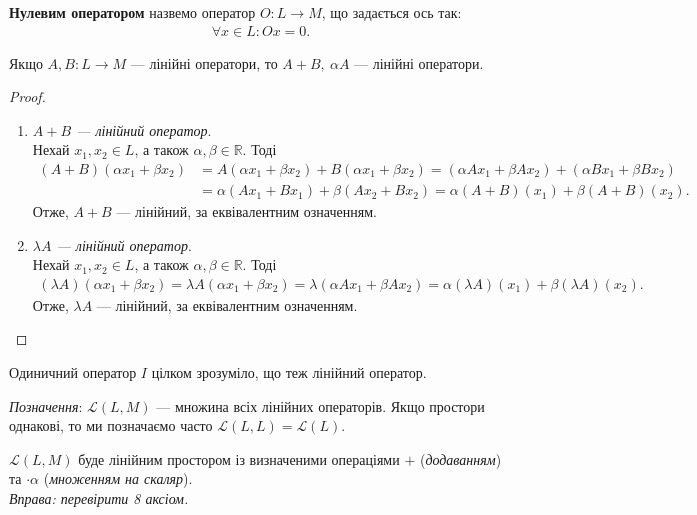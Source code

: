 \documentclass{math_library}
\begin{document}
	\begin{definition}
	\textbf{Нулевим оператором} назвемо оператор $O \colon L \to M$, що задається ось так:
	\begin{align*}
	\forall x \in L: Ox = 0.
	\end{align*}
	\end{definition}
	
	\begin{lemma}
	Якщо $A,B \colon L \to M$ --- лінійні оператори, то $A+B,\ \alpha A$ --- лінійні оператори.
	\end{lemma}
	
	\begin{proof}
	\begin{enumerate}[topsep=0pt,wide=0pt,label={\Roman*.}]
	\item \textit{$A+B$ --- лінійний оператор}.\\
	Нехай $x_1,x_2 \in L$, а також $\alpha,\beta \in \mathbb{R}$. Тоді
	\begin{align*}
	(A+B)(\alpha x_1 + \beta x_2) & = A (\alpha x_1 + \beta x_2) + B (\alpha x_1 + \beta x_2) = (\alpha Ax_1 + \beta Ax_2) + (\alpha Bx_1 + \beta Bx_2) \\
	& = \alpha (Ax_1 + B x_1) + \beta(Ax_2 + Bx_2) = \alpha (A+B)(x_1) + \beta (A+B)(x_2).
	\end{align*}
	Отже, $A+B$ --- лінійний, за еквівалентним означенням.
	
	\item \textit{$\lambda A$ --- лінійний оператор}.\\
	Нехай $x_1,x_2 \in L$, а також $\alpha,\beta \in \mathbb{R}$. Тоді
	\begin{align*}
	(\lambda A)(\alpha x_1 + \beta x_2) = \lambda A(\alpha x_1 + \beta x_2) = \lambda (\alpha Ax_1 + \beta A x_2) = \alpha (\lambda A)(x_1) + \beta (\lambda A)(x_2).
	\end{align*}
	Отже, $\lambda A$ --- лінійний, за еквівалентним означенням. \qedhere
	\end{enumerate}
	\end{proof}
	
	\begin{remark}
	Одиничний оператор $I$ цілком зрозуміло, що теж лінійний оператор.
	\end{remark}
	
	\textit{Позначення}: $\mathcal{L}(L,M)$ --- множина всіх лінійних операторів. Якщо простори однакові, то ми позначаємо часто $\mathcal{L}(L,L) = \mathcal{L}(L)$.
	 
	\begin{proposition}
	$\mathcal{L}(L,M)$ буде лінійним простором із визначеними операціями $+$ (\textit{додаванням}) та $\cdot \alpha$ (\textit{множенням на скаляр}).\\
	\textit{Вправа: перевірити 8 аксіом.}
	\end{proposition}
	
\end{document}
